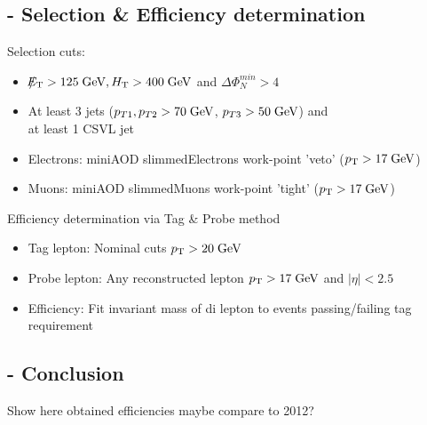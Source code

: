 \documentclass{beamer}
\begin{document}
\subsection{\Zll - Selection \& Efficiency determination}
\begin{frame}
Selection cuts:
\begin{itemize}
 \item $\slash\mkern-12mu{E}_{\text{T}} > 125 \;\text{Ge}\kern-0.06667em\text{V}, H_{\text{T}} > 400 \;\text{Ge}\kern-0.06667em\text{V} $ and $\Delta\Phi_{N}^{min}>4$
 \item At least 3 jets ($p_{T\text{1}},p_{T\text{2}} > 70\;\text{Ge}\kern-0.06667em\text{V}$, $p_{T\text{3}} > 50\;\text{Ge}\kern-0.06667em\text{V}$) and \\ at least 1 CSVL jet
 \item Electrons: miniAOD slimmedElectrons work-point 'veto' ($p_{\text{T}}>17\;\text{Ge}\kern-0.06667em\text{V}$)
 \item Muons: miniAOD slimmedMuons work-point 'tight' ($p_{\text{T}}>17\;\text{Ge}\kern-0.06667em\text{V}$)
\end{itemize}
Efficiency determination via Tag \& Probe method
\begin{itemize}
 \item Tag lepton: Nominal cuts $p_{\text{T}}>20\;\text{Ge}\kern-0.06667em\text{V}$
 \item Probe lepton: Any reconstructed lepton $p_{\text{T}}>17\;\text{Ge}\kern-0.06667em\text{V}$ and $|\eta|<2.5$
 \item Efficiency: Fit invariant mass of di lepton to events passing/failing tag requirement 
\end{itemize}
\end{frame}

\subsection{\Zll - Conclusion}
\begin{frame}
Show here obtained efficiencies maybe compare to 2012?
\end{frame}

\end{document}
